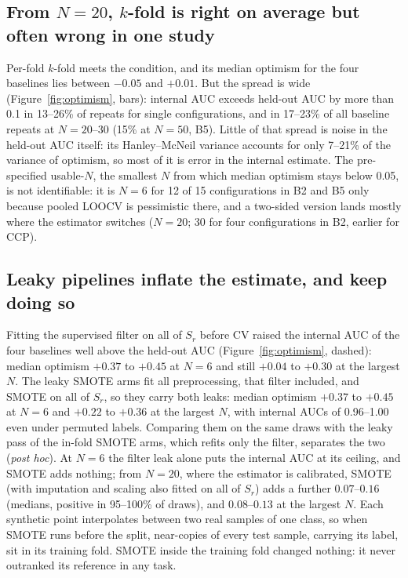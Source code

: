 \documentclass[10pt,letterpaper]{article}
\begin{document}
\subsection{From $N = 20$, $k$-fold is right on average but often wrong in one study}
Per-fold $k$-fold meets the condition, and its median optimism for the four baselines lies between $-0.05$ and
$+0.01$. But the spread is wide (Figure~\ref{fig:optimism}, bars): internal AUC exceeds held-out AUC by more
than 0.1 in 13--26\% of repeats for single configurations, and in 17--23\% of all baseline repeats at
$N = 20$--$30$ (15\% at $N = 50$, B5). Little of that spread is noise in the held-out AUC itself: its
Hanley--McNeil variance \citep{hanley1982auc} accounts for only 7--21\% of the variance of optimism, so most of
it is error in the internal estimate. The pre-specified usable-$N$, the smallest $N$ from which median optimism
stays below 0.05, is not identifiable: it is $N = 6$ for 12 of 15 configurations in B2 and B5 only because
pooled LOOCV is pessimistic there, and a two-sided version lands mostly where the estimator switches ($N = 20$;
30 for four configurations in B2, earlier for CCP).

\subsection{Leaky pipelines inflate the estimate, and keep doing so}
Fitting the supervised filter on all of $S_r$ before CV raised the internal AUC of the four baselines well
above the held-out AUC (Figure~\ref{fig:optimism}, dashed): median optimism $+0.37$ to $+0.45$ at $N = 6$ and
still $+0.04$ to $+0.30$ at the largest $N$. The leaky SMOTE arms fit all preprocessing, that filter included,
and SMOTE on all of $S_r$, so they carry both leaks: median optimism $+0.37$ to $+0.45$ at $N = 6$ and $+0.22$
to $+0.36$ at the largest $N$, with internal AUCs of 0.96--1.00 even under permuted labels. Comparing them on
the same draws with the leaky pass of the in-fold SMOTE arms, which refits only the filter, separates the two
(\emph{post hoc}). At $N = 6$ the filter leak alone puts the internal AUC at its ceiling, and SMOTE adds
nothing; from $N = 20$, where the estimator is calibrated, SMOTE (with imputation and scaling also fitted on
all of $S_r$) adds a further $0.07$--$0.16$ (medians, positive in 95--100\% of draws), and $0.08$--$0.13$ at
the largest $N$. Each synthetic point interpolates between two real samples of one class, so
when SMOTE runs before the split, near-copies of every test sample, carrying its label, sit in its training
fold. SMOTE inside the training fold changed nothing: it never outranked its reference in any task.
\end{document}
